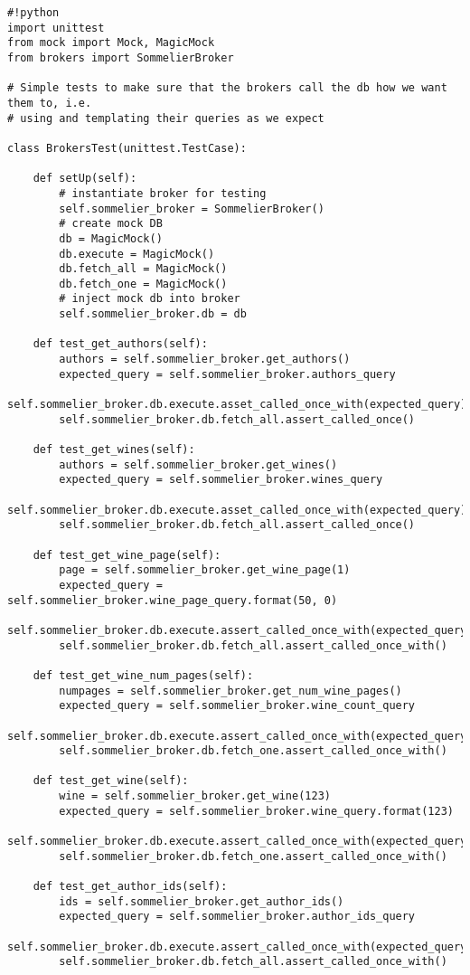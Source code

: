 \begin{verbatim}
#!python
import unittest
from mock import Mock, MagicMock
from brokers import SommelierBroker

# Simple tests to make sure that the brokers call the db how we want them to, i.e.
# using and templating their queries as we expect

class BrokersTest(unittest.TestCase):

    def setUp(self):
        # instantiate broker for testing
        self.sommelier_broker = SommelierBroker()
        # create mock DB
        db = MagicMock()
        db.execute = MagicMock()
        db.fetch_all = MagicMock()
        db.fetch_one = MagicMock()
        # inject mock db into broker
        self.sommelier_broker.db = db
 
    def test_get_authors(self):
        authors = self.sommelier_broker.get_authors()
        expected_query = self.sommelier_broker.authors_query
        self.sommelier_broker.db.execute.asset_called_once_with(expected_query)
        self.sommelier_broker.db.fetch_all.assert_called_once()
    
    def test_get_wines(self):
        authors = self.sommelier_broker.get_wines()
        expected_query = self.sommelier_broker.wines_query
        self.sommelier_broker.db.execute.asset_called_once_with(expected_query)
        self.sommelier_broker.db.fetch_all.assert_called_once()
    
    def test_get_wine_page(self):
        page = self.sommelier_broker.get_wine_page(1)
        expected_query = self.sommelier_broker.wine_page_query.format(50, 0)
        self.sommelier_broker.db.execute.assert_called_once_with(expected_query)
        self.sommelier_broker.db.fetch_all.assert_called_once_with()
    
    def test_get_wine_num_pages(self):
        numpages = self.sommelier_broker.get_num_wine_pages()
        expected_query = self.sommelier_broker.wine_count_query
        self.sommelier_broker.db.execute.assert_called_once_with(expected_query)
        self.sommelier_broker.db.fetch_one.assert_called_once_with()
    
    def test_get_wine(self):
        wine = self.sommelier_broker.get_wine(123)
        expected_query = self.sommelier_broker.wine_query.format(123)
        self.sommelier_broker.db.execute.assert_called_once_with(expected_query)
        self.sommelier_broker.db.fetch_one.assert_called_once_with()
    
    def test_get_author_ids(self):
        ids = self.sommelier_broker.get_author_ids()
        expected_query = self.sommelier_broker.author_ids_query
        self.sommelier_broker.db.execute.assert_called_once_with(expected_query)
        self.sommelier_broker.db.fetch_all.assert_called_once_with()


\end{verbatim}
